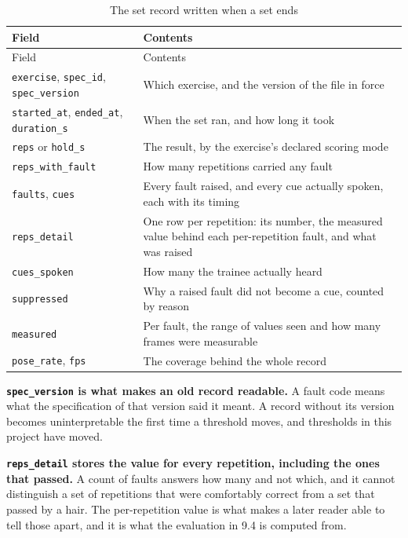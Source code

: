 {\small
\setlength{\LTpre}{6pt}\setlength{\LTpost}{8pt}
\begin{longtable}{>{\raggedright\arraybackslash}p{}>{\raggedright\arraybackslash}p{}}
\caption{The set record written when a set ends}\\
\toprule
Field & Contents \\
\midrule
\endfirsthead
\toprule
Field & Contents \\
\midrule
\endhead
\bottomrule
\endfoot
\bottomrule
\endlastfoot
\texttt{exercise}, \texttt{spec\_\allowbreak{}id}, \texttt{spec\_\allowbreak{}version} & Which exercise, and the version of the file in force \\
\texttt{started\_\allowbreak{}at}, \texttt{ended\_\allowbreak{}at}, \texttt{duration\_\allowbreak{}s} & When the set ran, and how long it took \\
\texttt{reps} or \texttt{hold\_\allowbreak{}s} & The result, by the exercise's declared scoring mode \\
\texttt{reps\_\allowbreak{}with\_\allowbreak{}fault} & How many repetitions carried any fault \\
\texttt{faults}, \texttt{cues} & Every fault raised, and every cue actually spoken, each with its timing \\
\texttt{reps\_\allowbreak{}detail} & One row per repetition: its number, the measured value behind each per-repetition fault, and what was raised \\
\texttt{cues\_\allowbreak{}spoken} & How many the trainee actually heard \\
\texttt{suppressed} & Why a raised fault did not become a cue, counted by reason \\
\texttt{measured} & Per fault, the range of values seen and how many frames were measurable \\
\texttt{pose\_\allowbreak{}rate}, \texttt{fps} & The coverage behind the whole record \\
\end{longtable}
}

\textbf{\texttt{spec\_\allowbreak{}version} is what makes an old record readable.} A fault code means what the specification of that version said it meant. A record without its version becomes uninterpretable the first time a threshold moves, and thresholds in this project have moved.

\textbf{\texttt{reps\_\allowbreak{}detail} stores the value for every repetition, including the ones that passed.} A count of faults answers how many and not which, and it cannot distinguish a set of repetitions that were comfortably correct from a set that passed by a hair. The per-repetition value is what makes a later reader able to tell those apart, and it is what the evaluation in 9.4 is computed from.

